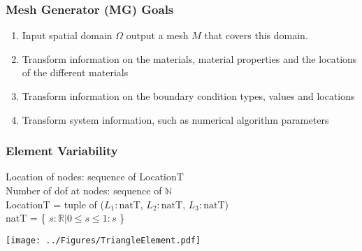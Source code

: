 \documentclass[t,12pt,numbers,fleqn]{beamer}
\begin{document}
\begin{frame}

\frametitle{Mesh Generator (MG) Goals}

\begin{enumerate}[G1]

\item Input spatial domain $\Omega$ output a mesh $M$ that covers this domain.

\item Transform information on the materials, material properties and the
locations of the different materials

\item Transform information on the boundary condition types, values and locations

\item Transform system information, such as numerical algorithm parameters

\end{enumerate}

\end{frame}


\begin{frame}

\frametitle{Element Variability}

Location of nodes: sequence of LocationT \\
Number of dof at nodes: sequence of $\mathbb{N}$ \\
LocationT = tuple of ($L_1: \mbox{natT}$, $L_2: \mbox{natT}$, $L_3: \mbox{natT}$)\\
natT = \{ $s: \mathbb{R} | 0 \leq s \leq 1 : s$ \}\\

\begin{center}
{
 \texttt{[image: ../Figures/TriangleElement.pdf]}
}
\end{center}

\end{frame}

\end{document}
